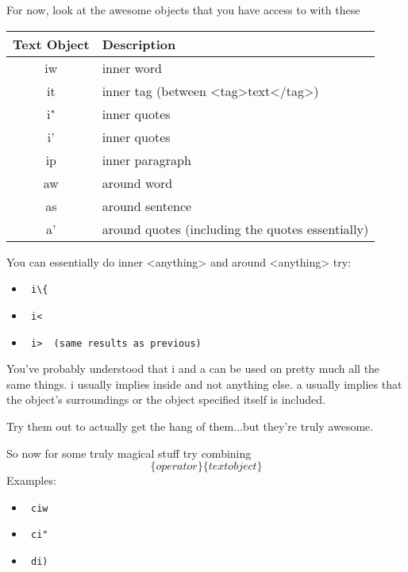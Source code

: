 \documentclass[12pt, letterpaper]{article}
\begin{document}
For now, look at the awesome objects that you have access to with these
\begin{table}[H]
    \begin{tabular}{|c|l|}
        Text Object & Description \\
        \hline
        iw & inner word \\
        \hline
        it & inner tag (between <tag>text</tag>) \\
        \hline
        i" & inner quotes \\
        \hline
        i' & inner quotes \\
        \hline
        ip & inner paragraph \\
        \hline
        aw & around word \\
        \hline
        as & around sentence \\
        \hline
        a' & around quotes (including the quotes essentially) \\
        \hline
    \end{tabular}
\end{table}

You can essentially do inner <anything> and around <anything>
try:
\begin{itemize}
    \item \begin{verbatim} i\{ \end{verbatim}
    \item \begin{verbatim} i< \end{verbatim}
    \item \begin{verbatim} i>  (same results as previous) \end{verbatim}
\end{itemize}

You've probably understood that i and a can be used on pretty much all the same things. i usually implies inside and not anything else. a usually implies that the object's surroundings or the object specified itself is included. 

Try them out to actually get the hang of them...but they're truly awesome.

So now for some truly magical stuff try combining
$$\{operator\}\{text object\}$$
Examples: 
\begin{itemize}
    \item \begin{verbatim} ciw \end{verbatim}
    \item \begin{verbatim} ci" \end{verbatim}
    \item \begin{verbatim} di) \end{verbatim}
\end{itemize}
\end{document}
